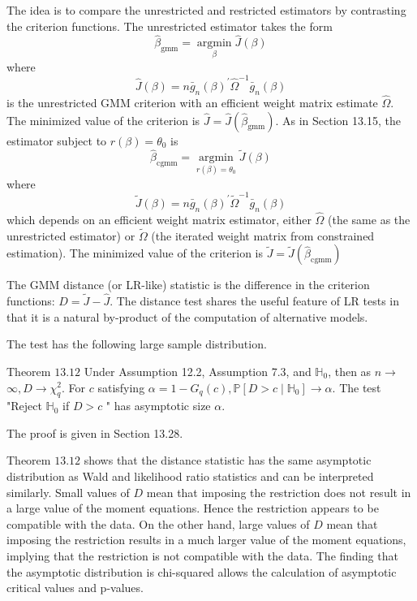\documentclass[10pt]{article}
\begin{document}
The idea is to compare the unrestricted and restricted estimators by contrasting the criterion functions. The unrestricted estimator takes the form
$$
\widehat{\beta}_{\mathrm{gmm}}=\underset{\beta}{\operatorname{argmin}} \widehat{J}(\beta)
$$
where
$$
\widehat{J}(\beta)=n \bar{g}_{n}(\beta)^{\prime} \widehat{\Omega}^{-1} \bar{g}_{n}(\beta)
$$
is the unrestricted GMM criterion with an efficient weight matrix estimate $\widehat{\Omega}$. The minimized value of the criterion is $\widehat{J}=\widehat{J}\left(\widehat{\beta}_{\mathrm{gmm}}\right)$. As in Section 13.15, the estimator subject to $r(\beta)=\theta_{0}$ is
$$
\widehat{\beta}_{\mathrm{cgmm}}=\underset{r(\beta)=\theta_{0}}{\operatorname{argmin}} \widetilde{J}(\beta)
$$
where
$$
\widetilde{J}(\beta)=n \bar{g}_{n}(\beta)^{\prime} \widetilde{\Omega}^{-1} \bar{g}_{n}(\beta)
$$
which depends on an efficient weight matrix estimator, either $\widehat{\Omega}$ (the same as the unrestricted estimator) or $\widetilde{\Omega}$ (the iterated weight matrix from constrained estimation). The minimized value of the criterion is $\widetilde{J}=\widetilde{J}\left(\widehat{\beta}_{\operatorname{cgmm}}\right)$

The GMM distance (or LR-like) statistic is the difference in the criterion functions: $D=\widetilde{J}-\widehat{J}$. The distance test shares the useful feature of LR tests in that it is a natural by-product of the computation of alternative models.

The test has the following large sample distribution.

Theorem $13.12$ Under Assumption 12.2, Assumption 7.3, and $\mathbb{H}_{0}$, then as $n \rightarrow$ $\infty, D \longrightarrow \chi_{q}^{2}$. For $c$ satisfying $\alpha=1-G_{q}(c), \mathbb{P}\left[D>c \mid \mathbb{H}_{0}\right] \longrightarrow \alpha$. The test "Reject $\mathbb{H}_{0}$ if $D>c$ " has asymptotic size $\alpha$.

The proof is given in Section 13.28.

Theorem $13.12$ shows that the distance statistic has the same asymptotic distribution as Wald and likelihood ratio statistics and can be interpreted similarly. Small values of $D$ mean that imposing the restriction does not result in a large value of the moment equations. Hence the restriction appears to be compatible with the data. On the other hand, large values of $D$ mean that imposing the restriction results in a much larger value of the moment equations, implying that the restriction is not compatible with the data. The finding that the asymptotic distribution is chi-squared allows the calculation of asymptotic critical values and p-values.
\end{document}
